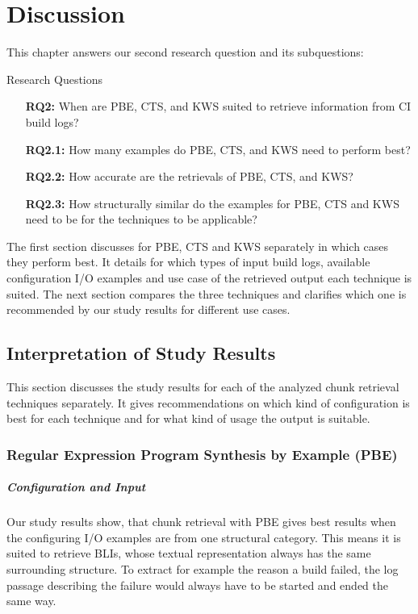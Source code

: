 \documentclass[\myrootdir/main.tex]{subfiles}
\begin{document}
\chapter{Discussion}

This chapter answers our second research question and its subquestions:
\begin{simplebox}{Research Questions}
\begin{itemize}
  \item[\textbf{RQ2:}] When are PBE, CTS, and KWS suited to retrieve information from CI build logs?
  \item[\textbf{RQ2.1:}] How many examples do PBE, CTS, and KWS need to perform best?
  \item[\textbf{RQ2.2:}] How accurate are the retrievals of PBE, CTS, and KWS?
  \item[\textbf{RQ2.3:}] How structurally similar do the examples for PBE, CTS and KWS need to be for the techniques to be applicable?
\end{itemize}
\end{simplebox}

The first section discusses for PBE, CTS and KWS separately in which cases they perform best.
It details for which types of input build logs, available configuration I/O examples and use case of the retrieved output each technique is suited.
The next section compares the three techniques and clarifies which one is recommended by our study results for different use cases.

\section{Interpretation of Study Results}
This section discusses the study results for each of the analyzed chunk retrieval techniques separately.
It gives recommendations on which kind of configuration is best for each technique and for what kind of usage the output is suitable.

\subsection{Regular Expression Program Synthesis by Example (PBE)}
\paragraph{Configuration and Input}
Our study results show, that chunk retrieval with PBE gives best results when the configuring I/O examples are from one structural category.
This means it is suited to retrieve BLIs, whose textual representation always has the same surrounding structure.
To extract for example the reason a build failed, the log passage describing the failure would always have to be started and ended the same way.
\end{document}
